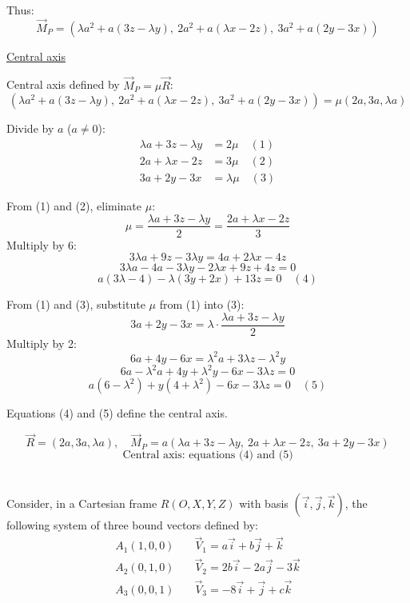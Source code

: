 \documentclass[12pt]{article}
\begin{document}
\begin{correctionbox}
Thus:
\[
\vec{M}_P = (\lambda a^2 + a(3z - \lambda y), \ 2a^2 + a(\lambda x - 2z), \ 3a^2 + a(2y - 3x))
\]

\underline{Central axis}

Central axis defined by $\vec{M}_P = \mu \vec{R}$:
\[
(\lambda a^2 + a(3z - \lambda y), \ 2a^2 + a(\lambda x - 2z), \ 3a^2 + a(2y - 3x)) = \mu(2a, 3a, \lambda a)
\]

Divide by $a$ ($a \neq 0$):
\begin{align*}
\lambda a + 3z - \lambda y &= 2\mu \quad (1) \\
2a + \lambda x - 2z &= 3\mu \quad (2) \\
3a + 2y - 3x &= \lambda\mu \quad (3)
\end{align*}

From (1) and (2), eliminate $\mu$:
\[
\mu = \frac{\lambda a + 3z - \lambda y}{2} = \frac{2a + \lambda x - 2z}{3}
\]
Multiply by 6:
\[
3\lambda a + 9z - 3\lambda y = 4a + 2\lambda x - 4z
\]
\[
3\lambda a - 4a - 3\lambda y - 2\lambda x + 9z + 4z = 0
\]
\[
a(3\lambda - 4) - \lambda(3y + 2x) + 13z = 0 \quad (4)
\]

From (1) and (3), substitute $\mu$ from (1) into (3):
\[
3a + 2y - 3x = \lambda \cdot \frac{\lambda a + 3z - \lambda y}{2}
\]
Multiply by 2:
\[
6a + 4y - 6x = \lambda^2 a + 3\lambda z - \lambda^2 y
\]
\[
6a - \lambda^2 a + 4y + \lambda^2 y - 6x - 3\lambda z = 0
\]
\[
a(6 - \lambda^2) + y(4 + \lambda^2) - 6x - 3\lambda z = 0 \quad (5)
\]

Equations (4) and (5) define the central axis.

\[
\boxed{\vec{R} = (2a, 3a, \lambda a), \quad \vec{M}_P = a(\lambda a + 3z - \lambda y, \ 2a + \lambda x - 2z, \ 3a + 2y - 3x)}
\]
\[
\boxed{\text{Central axis: equations (4) and (5)}}
\]
\end{correctionbox}

\section{}

Consider, in a Cartesian frame $R(O, X, Y, Z)$ with basis $(\vec{i}, \vec{j}, \vec{k})$, the following system of three bound vectors defined by:
\begin{align*}
A_1(1, 0, 0) &\quad \vec{V}_1 = a\vec{i} + b\vec{j} + \vec{k} \\
A_2(0, 1, 0) &\quad \vec{V}_2 = 2b\vec{i} - 2a\vec{j} - 3\vec{k} \\
A_3(0, 0, 1) &\quad \vec{V}_3 = -8\vec{i} + \vec{j} + c\vec{k}
\end{align*}
\end{document}
